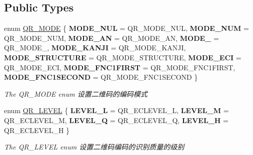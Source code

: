 \subsection*{Public Types}
\begin{DoxyCompactItemize}
\item 
\mbox{\label{class_q_qt_custom_qr_encode_widget_a57caf10e5dda4bb3f138018d083071e6}} 
enum \mbox{\hyperlink{class_q_qt_custom_qr_encode_widget_a57caf10e5dda4bb3f138018d083071e6}{Q\+R\+\_\+\+M\+O\+DE}} \{ \newline
{\bfseries M\+O\+D\+E\+\_\+\+N\+UL} = Q\+R\+\_\+\+M\+O\+D\+E\+\_\+\+N\+UL, 
{\bfseries M\+O\+D\+E\+\_\+\+N\+UM} = Q\+R\+\_\+\+M\+O\+D\+E\+\_\+\+N\+UM, 
{\bfseries M\+O\+D\+E\+\_\+\+AN} = Q\+R\+\_\+\+M\+O\+D\+E\+\_\+\+AN, 
{\bfseries M\+O\+D\+E\+\_} = Q\+R\+\_\+\+M\+O\+D\+E\+\_, 
\newline
{\bfseries M\+O\+D\+E\+\_\+\+K\+A\+N\+JI} = Q\+R\+\_\+\+M\+O\+D\+E\+\_\+\+K\+A\+N\+JI, 
{\bfseries M\+O\+D\+E\+\_\+\+S\+T\+R\+U\+C\+T\+U\+RE} = Q\+R\+\_\+\+M\+O\+D\+E\+\_\+\+S\+T\+R\+U\+C\+T\+U\+RE, 
{\bfseries M\+O\+D\+E\+\_\+\+E\+CI} = Q\+R\+\_\+\+M\+O\+D\+E\+\_\+\+E\+CI, 
{\bfseries M\+O\+D\+E\+\_\+\+F\+N\+C1\+F\+I\+R\+ST} = Q\+R\+\_\+\+M\+O\+D\+E\+\_\+\+F\+N\+C1\+F\+I\+R\+ST, 
\newline
{\bfseries M\+O\+D\+E\+\_\+\+F\+N\+C1\+S\+E\+C\+O\+ND} = Q\+R\+\_\+\+M\+O\+D\+E\+\_\+\+F\+N\+C1\+S\+E\+C\+O\+ND
 \}
\begin{DoxyCompactList}\small\item\em The Q\+R\+\_\+\+M\+O\+DE enum 设置二维码的编码模式 \end{DoxyCompactList}\item 
\mbox{\label{class_q_qt_custom_qr_encode_widget_a6107aaf68178d54d1274f0afc2ec310b}} 
enum \mbox{\hyperlink{class_q_qt_custom_qr_encode_widget_a6107aaf68178d54d1274f0afc2ec310b}{Q\+R\+\_\+\+L\+E\+V\+EL}} \{ {\bfseries L\+E\+V\+E\+L\+\_\+L} = Q\+R\+\_\+\+E\+C\+L\+E\+V\+E\+L\+\_\+L, 
{\bfseries L\+E\+V\+E\+L\+\_\+M} = Q\+R\+\_\+\+E\+C\+L\+E\+V\+E\+L\+\_\+M, 
{\bfseries L\+E\+V\+E\+L\+\_\+Q} = Q\+R\+\_\+\+E\+C\+L\+E\+V\+E\+L\+\_\+Q, 
{\bfseries L\+E\+V\+E\+L\+\_\+H} = Q\+R\+\_\+\+E\+C\+L\+E\+V\+E\+L\+\_\+H
 \}
\begin{DoxyCompactList}\small\item\em The Q\+R\+\_\+\+L\+E\+V\+EL enum 设置二维码编码的识别质量的级别 \end{DoxyCompactList}\end{DoxyCompactItemize}
